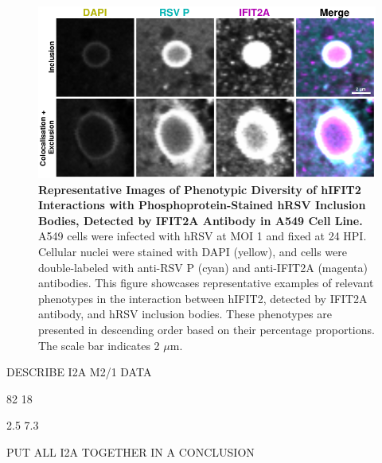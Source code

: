 \begin{figure}
    \centering
    \includegraphics[width=1\linewidth]{08. Chapter 3/Figs/02. Infection/02. IFIT2/01. IFIT2A/06. i2a a549 hrsv p.pdf} 
    \caption[Representative Images of Phenotypic Diversity of hIFIT2 Interactions with Phosphoprotein-Stained hRSV Inclusion Bodies, Detected by IFIT2A Antibody in A549 Cell Line.]{\textbf{Representative Images of Phenotypic Diversity of hIFIT2 Interactions with Phosphoprotein-Stained hRSV Inclusion Bodies, Detected by IFIT2A Antibody in A549 Cell Line.} A549 cells were infected with hRSV at MOI 1 and fixed at 24 HPI. Cellular nuclei were stained with DAPI (yellow), and cells were double-labeled with anti-RSV P (cyan) and anti-IFIT2A (magenta) antibodies. This figure showcases representative examples of relevant phenotypes in the interaction between hIFIT2, detected by IFIT2A antibody, and hRSV inclusion bodies. These phenotypes are presented in descending order based on their percentage proportions. The scale bar indicates 2 \(\mu \mbox{m}\).}
    \label{fig:Representative Images of Phenotypic Diversity of hIFIT2 Interactions with Phosphoprotein-Stained hRSV Inclusion Bodies, Detected by IFIT2A Antibody in A549 Cell Line}
\end{figure}

DESCRIBE I2A M2/1 DATA

82 18

2.5 7.3

PUT ALL I2A TOGETHER IN A CONCLUSION

